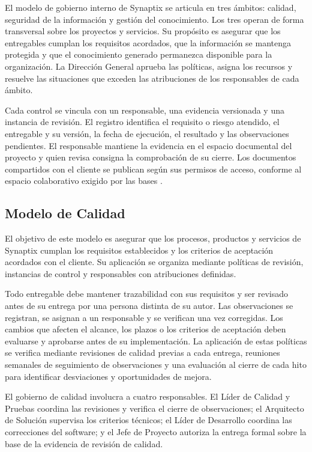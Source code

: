 El modelo de gobierno interno de Synaptix se articula en tres ámbitos: calidad, seguridad de la información y gestión del conocimiento. Los tres operan de forma transversal sobre los proyectos y servicios. Su propósito es asegurar que los entregables cumplan los requisitos acordados, que la información se mantenga protegida y que el conocimiento generado permanezca disponible para la organización. La Dirección General aprueba las políticas, asigna los recursos y resuelve las situaciones que exceden las atribuciones de los responsables de cada ámbito.

Cada control se vincula con un responsable, una evidencia versionada y una instancia de revisión. El registro identifica el requisito o riesgo atendido, el entregable y su versión, la fecha de ejecución, el resultado y las observaciones pendientes. El responsable mantiene la evidencia en el espacio documental del proyecto y quien revisa consigna la comprobación de su cierre. Los documentos compartidos con el cliente se publican según sus permisos de acceso, conforme al espacio colaborativo exigido por las bases \parencite[RT-19.05, p.~33]{bases-transversales}.

\subsection{Modelo de Calidad}

El objetivo de este modelo es asegurar que los procesos, productos y servicios de Synaptix cumplan los requisitos establecidos y los criterios de aceptación acordados con el cliente. Su aplicación se organiza mediante políticas de revisión, instancias de control y responsables con atribuciones definidas.

Todo entregable debe mantener trazabilidad con sus requisitos y ser revisado antes de su entrega por una persona distinta de su autor. Las observaciones se registran, se asignan a un responsable y se verifican una vez corregidas. Los cambios que afecten el alcance, los plazos o los criterios de aceptación deben evaluarse y aprobarse antes de su implementación. La aplicación de estas políticas se verifica mediante revisiones de calidad previas a cada entrega, reuniones semanales de seguimiento de observaciones y una evaluación al cierre de cada hito para identificar desviaciones y oportunidades de mejora.

El gobierno de calidad involucra a cuatro responsables. El Líder de Calidad y Pruebas coordina las revisiones y verifica el cierre de observaciones; el Arquitecto de Solución supervisa los criterios técnicos; el Líder de Desarrollo coordina las correcciones del software; y el Jefe de Proyecto autoriza la entrega formal sobre la base de la evidencia de revisión de calidad.

